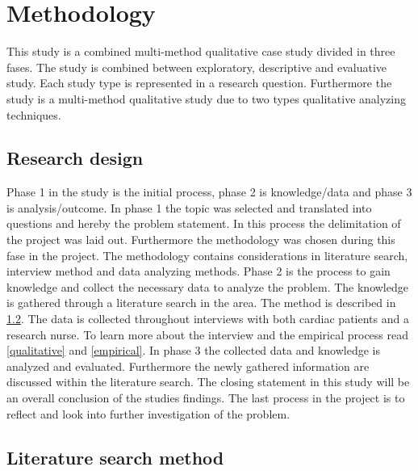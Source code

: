 \chapter{Methodology}

This study is a combined multi-method qualitative case study divided in three fases.
The study is combined between exploratory, descriptive and evaluative study. Each study type is represented in a research question. Furthermore the study is a multi-method qualitative study due to two types qualitative analyzing techniques. 
\section{Research design}


 Phase 1 in the study is the initial process, phase 2 is knowledge/data and phase 3 is analysis/outcome. 
In phase 1 the topic was selected and translated into questions and hereby the problem statement. In this process the delimitation of the project was laid out. Furthermore the methodology was chosen during this fase in the project. The methodology contains considerations in literature search, interview method and data analyzing methods. 
Phase 2 is the process to gain knowledge and collect the necessary data to analyze the problem. The knowledge is gathered through a literature search in the area. The method is described in \cref{literature}. The data is collected throughout interviews with both cardiac patients and a research nurse. To learn more about the interview and the empirical process read \cref{qualitative} and \cref{empirical}.
In phase 3 the collected data and knowledge is analyzed and evaluated. Furthermore the newly gathered information are discussed within the literature search. The closing statement in this study will be an overall conclusion of the studies findings. The last process in the project is to reflect and look into further investigation of the problem. 


\section{Literature search method}
\label{literature}

